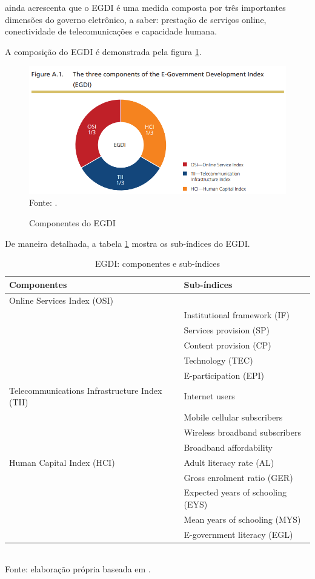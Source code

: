 \cite{ONU_EGDI_description} ainda acrescenta que o EGDI é uma medida composta por três importantes dimensões do governo eletrônico, a saber: prestação de serviços online, conectividade de telecomunicações e capacidade humana. 

A composição do EGDI é demonstrada pela figura \ref{fig:egdi_componentes}.

\begin{figure}[H]
    \centering
    \caption{Componentes do EGDI}
    \includegraphics[width=1\linewidth]{figuras/egdi_componentes.png}
    \label{fig:egdi_componentes}
    \footnotesize{Fonte: \cite{ONU_EGDI_description}.}
\end{figure}

De maneira detalhada, a tabela \ref{tab:egdi_componentes_subindices} mostra os sub-índices do EGDI.

\begin{table}[H]
	\centering
	\caption{EGDI: componentes e sub-índices}
	\label{tab:egdi_componentes_subindices}
	\begin{tabular}{|p{5.5cm}|l|}
		\hline
		\textbf{Componentes} & \textbf{Sub-índices} \\
		\hline
		Online Services Index (OSI) & \\
		& Institutional framework (IF) \\ 
		& Services provision (SP) \\
		& Content provision (CP) \\
		& Technology (TEC) \\
		& E-participation (EPI) \\
		\hline
		Telecommunications Infrastructure Index (TII) & Internet users \\
		& Mobile cellular subscribers \\
		& Wireless broadband subscribers \\
		& Broadband affordability \\
		\hline
		Human Capital Index (HCI) & Adult literacy rate (AL) \\
		& Gross enrolment ratio (GER) \\
		& Expected years of schooling (EYS) \\
		& Mean years of schooling (MYS) \\
		& E-government literacy (EGL) \\
		\hline
	\end{tabular}
	\\ \footnotesize{Fonte: elaboração própria baseada em \cite{onu_egov_survey_2024}.}
\end{table}

